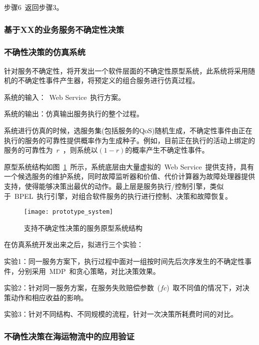 步骤6~返回步骤3。

\subsubsection{基于XX的业务服务不确定性决策}
\setcounter{paragraph}{0}


\subsubsection{不确性决策的仿真系统}

针对服务不确定性，将开发出一个软件层面的不确定性原型系统，此系统将采用随机的不确定性事件产生器，将预定义的组合服务进行仿真过程。

系统的输入：~Web Service~执行方案。

系统的输出：仿真输出服务执行的整个过程。

系统进行仿真的时候，选服务集(包括服务的QoS)随机生成，不确定性事件由正在执行的服务的可靠性提供概率作为生成种子。例如，目前正在执行的活动上绑定的服务的可靠性为~$r$~，则系统以$(1-r)$的概率产生不确定性事件。

原型系统结构如图~\ref{figure:prototype_system}~所示，系统底层由大量虚拟的~Web Service~提供支持，具有一个候选服务的维护系统，同时故障监听器和价值、代价计算器为故障处理器提供支持，使得能够决策出最优的动作。最上层是服务执行/控制引擎，类似于~BPEL~执行引擎，对组合软件服务的执行进行控制、决策和故障恢复。

\begin{figure}[htbp]
    \centering
    \texttt{[image: prototype\_system]}
    \caption{支持不确定性决策的服务原型系统结构}\label{figure:prototype_system}
    \vspace{-1em}
\end{figure}


在仿真系统开发出来之后，拟进行三个实验：

实验1：同一服务方案下，执行过程中面对一组按时间先后次序发生的不确定性事件，分别采用~MDP~和贪心策略，对比决策效果。

实验2：针对同一服务方案，在服务失败赔偿参数~($fc$)~取不同值的情况下，对决策动作和相应收益的影响。

实验3：针对不同结构、不同规模的流程，针对一次决策所耗费时间的对比。

\subsubsection{不确性决策在海运物流中的应用验证}


